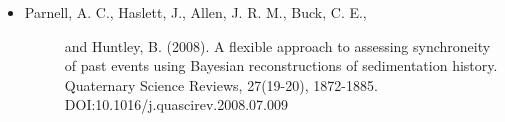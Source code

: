 \documentclass[letterpaper,10pt,english]{sphinxmanual}
\begin{document}
\begin{fulllineitems}
\begin{description}
\begin{description}
\begin{itemize}
\item {} \begin{description}
\item[{Parnell, A. C., Haslett, J., Allen, J. R. M., Buck, C. E., }] \leavevmode
and Huntley, B. (2008). A flexible approach to assessing 
synchroneity of past events using Bayesian reconstructions
of sedimentation history. Quaternary Science Reviews, 
27(19-20), 1872-1885. DOI:10.1016/j.quascirev.2008.07.009

\end{description}

\end{itemize}

\end{description}

\end{description}

\end{fulllineitems}

\end{document}
